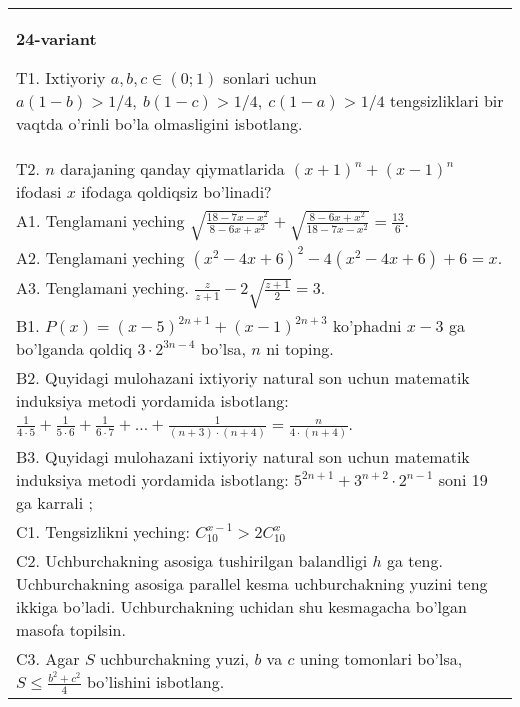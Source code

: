 \documentclass{article}
\begin{document}
\begin{tabular}{m{17cm}}
\textbf{24-variant}
\newline

T1. Ixtiyoriy \(a,b,c \in (0;1)\) sonlari uchun \(a(1 - b) > 1/4,\ b(1 - c) > 1/4,\ c(1 - a) > 1/4\) tengsizliklari bir vaqtda o'rinli bo'la olmasligini isbotlang. \\
T2. \(n\) darajaning qanday qiymatlarida \((x + 1)^{n} + (x - 1)^{n}\) ifodasi \(x\) ifodaga qoldiqsiz bo'linadi? \\
A1. Tenglamani yeching \(\sqrt{\frac{18 - 7x - x^{2}}{8 - 6x + x^{2}}} + \sqrt{\frac{8 - 6x + x^{2}}{18 - 7x - x^{2}}} = \frac{13}{6}\). \\
A2. Tenglamani yeching \(\left( x^{2} - 4x + 6 \right)^{2} - 4\left( x^{2} - 4x + 6 \right) + 6 = x\). \\
A3. Tenglamani yeching. \(\frac{z}{z + 1} - 2\sqrt{\frac{z + 1}{2}} = 3\). \\
B1. \(P(x) = (x - 5)^{2n + 1} + (x - 1)^{2n + 3}\) ko'phadni \(x - 3\) ga bo'lganda qoldiq \(3 \cdot 2^{3n - 4}\) bo'lsa, \(n\) ni toping. \\
B2. Quyidagi mulohazani ixtiyoriy natural son uchun matematik induksiya metodi yordamida isbotlang: \(\frac{1}{4 \cdot 5} + \frac{1}{5 \cdot 6} + \frac{1}{6 \cdot 7} + \ldots + \frac{1}{(n + 3) \cdot (n + 4)} = \frac{n}{4 \cdot (n + 4)}\). \\
B3. Quyidagi mulohazani ixtiyoriy natural son uchun matematik induksiya metodi yordamida isbotlang: \(5^{2n + 1} + 3^{n + 2} \cdot 2^{n - 1}\) soni 19 ga karrali ; \\
C1. Tengsizlikni yeching: \(C_{10}^{x - 1} > 2C_{10}^{x}\) \\
C2. Uchburchakning asosiga tushirilgan balandligi \(h\) ga teng. Uchburchakning asosiga parallel kesma uchburchakning yuzini teng ikkiga bo'ladi. Uchburchakning uchidan shu kesmagacha bo'lgan masofa topilsin. \\
C3. Agar \(S\) uchburchakning yuzi, \(b\) va \(c\) uning tomonlari bo'lsa, \(S \leq \frac{b^{2} + c^{2}}{4}\) bo'lishini isbotlang. \\

\end{tabular}
\vspace{1cm}
\end{document}
